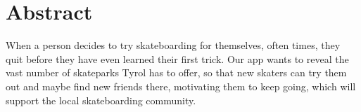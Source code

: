 \section*{Abstract}

When a person decides to try skateboarding for themselves, often times, they quit before they have
even learned their first trick. Our app wants to reveal the vast number of skateparks Tyrol has to
offer, so that new skaters can try them out and maybe find new friends there, motivating them to
keep going, which will support the local skateboarding community.


\newpage